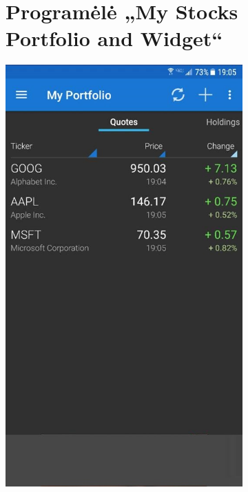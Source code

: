 \documentclass[a4paper,12pt,fleqn]{article}
\begin{document}
\newpage
\begin{appendices}
	
\begin{figure}[h!]
	\centering
	\begin{subfigure}{0.5\textwidth}
		\centering
		\tocless\section{Programėlė „My Stocks Portfolio and Widget“}
		\includegraphics[scale=0.532]{priedas1.jpg}

\end{subfigure}
\end{figure}
\end{appendices}
\end{document}
